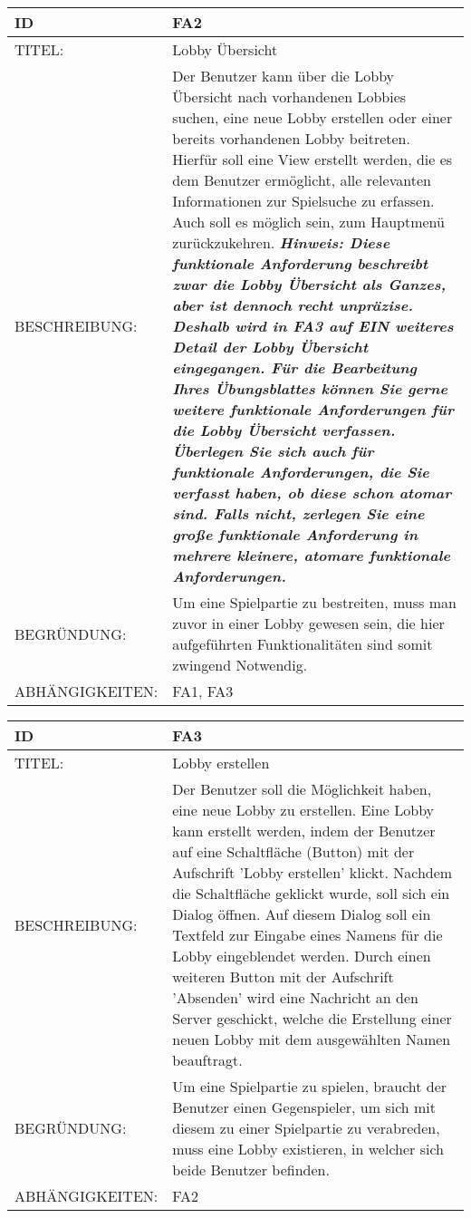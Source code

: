 \documentclass{uulm-assignment}
\begin{document}
\begin{tabularx}{16cm}{l|X}
\textbf{ID} & \textbf{FA2} \\
\hline
TITEL: & Lobby Übersicht \\
\hline
BESCHREIBUNG: & Der Benutzer kann über die Lobby Übersicht nach vorhandenen Lobbies suchen, eine neue Lobby erstellen oder einer bereits vorhandenen Lobby beitreten. Hierfür soll eine View erstellt werden, die es dem Benutzer ermöglicht, alle relevanten Informationen zur Spielsuche zu erfassen.
Auch soll es möglich sein, zum Hauptmenü zurückzukehren.
\textbf{\textit{Hinweis: Diese funktionale Anforderung beschreibt zwar die Lobby Übersicht als Ganzes, aber ist dennoch recht unpräzise. Deshalb wird in FA3 auf EIN weiteres Detail der Lobby Übersicht eingegangen. Für die Bearbeitung Ihres Übungsblattes können Sie gerne weitere funktionale Anforderungen für die Lobby Übersicht verfassen. Überlegen Sie sich auch für funktionale Anforderungen, die Sie verfasst haben, ob diese schon atomar sind. Falls nicht, zerlegen Sie eine große funktionale Anforderung in mehrere kleinere, atomare funktionale Anforderungen.}}
\\
\hline
BEGRÜNDUNG: & Um eine Spielpartie zu bestreiten, muss man zuvor in einer Lobby gewesen sein, die hier aufgeführten Funktionalitäten sind somit zwingend Notwendig. \\
\hline
ABHÄNGIGKEITEN: & FA1, FA3\\
\end{tabularx}

\begin{tabularx}{16cm}{l|X}
\textbf{ID} & \textbf{FA3} \\
\hline
TITEL: & Lobby erstellen \\
\hline
BESCHREIBUNG: & Der Benutzer soll die Möglichkeit haben, eine neue Lobby zu erstellen. Eine Lobby kann erstellt werden, indem der Benutzer auf eine Schaltfläche (Button) mit der Aufschrift 'Lobby erstellen' klickt. Nachdem die Schaltfläche geklickt wurde, soll sich ein Dialog öffnen. Auf diesem Dialog soll ein Textfeld zur Eingabe eines Namens für die Lobby eingeblendet werden. Durch einen weiteren Button mit der Aufschrift 'Absenden' wird eine Nachricht an den Server geschickt, welche die Erstellung einer neuen Lobby mit dem ausgewählten Namen beauftragt.
\\
\hline
BEGRÜNDUNG: & Um eine Spielpartie zu spielen, braucht der Benutzer einen Gegenspieler, um sich mit diesem zu einer Spielpartie zu verabreden, muss eine Lobby existieren, in welcher sich beide Benutzer befinden. \\
\hline
ABHÄNGIGKEITEN: & FA2\\
\end{tabularx}
\end{document}
